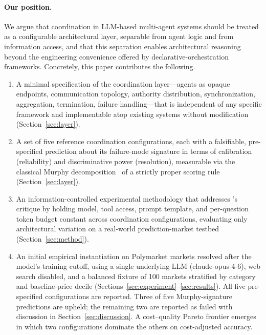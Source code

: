 \documentclass[11pt]{article}
\begin{document}
\paragraph{Our position.}
We argue that coordination in LLM-based multi-agent systems should be treated as a configurable architectural layer, separable from agent logic and from information access, and that this separation enables architectural reasoning beyond the engineering convenience offered by declarative-orchestration frameworks. Concretely, this paper contributes the following.
\begin{enumerate}
\item A minimal specification of the coordination layer---agents as opaque endpoints, communication topology, authority distribution, synchronization, aggregation, termination, failure handling---that is independent of any specific framework and implementable atop existing systems without modification (Section~\ref{sec:layer}).
\item A set of five reference coordination configurations, each with a falsifiable, pre-specified prediction about its failure-mode signature in terms of calibration (reliability) and discriminative power (resolution), measurable via the classical Murphy decomposition~\citep{murphy1973decomposition} of a strictly proper scoring rule (Section~\ref{sec:layer}).
\item An information-controlled experimental methodology that addresses \citet{reliability2026}'s critique by holding model, tool access, prompt template, and per-question token budget constant across coordination configurations, evaluating only architectural variation on a real-world prediction-market testbed (Section~\ref{sec:method}).
\item An initial empirical instantiation on Polymarket markets resolved after the model's training cutoff, using a single underlying LLM (claude-opus-4-6), web search disabled, and a balanced fixture of 100 markets stratified by category and baseline-price decile (Sections~\ref{sec:experiment}--\ref{sec:results}). All five pre-specified configurations are reported. Three of five Murphy-signature predictions are upheld; the remaining two are reported as failed with discussion in Section~\ref{sec:discussion}. A cost--quality Pareto frontier emerges in which two configurations dominate the others on cost-adjusted accuracy.
\end{enumerate}
\end{document}
